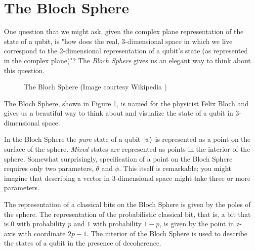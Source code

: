 \documentclass[11pt, oneside]{article}   	%
\begin{document}
\section{The Bloch Sphere}
One question that we might ask, given the complex plane representation of the state of a qubit, is "how does the real, 3-dimensional space in which we live correspond 
to the 2-dimensional representation of a qubit's state (as represented in the complex plane)"? The \emph{Bloch Sphere} gives us an elegant way to think about this question.

\begin{figure}[h]
\caption{The Bloch Sphere (Image courtesy Wikipedia \cite{wiki:bloch_sphere})}
\label{fig:bloch_sphere}
\end{figure}

\bigskip
\noindent
The Bloch Sphere, shown in Figure \ref{fig:bloch_sphere}, is named for the physicist Felix Bloch \cite{1946PhRv...70..460B} and gives us a beautiful way to think about and 
visualize the state of a qubit in 3-dimensional space.  

\bigskip
\noindent
In the Bloch Sphere the \emph{pure} state of a qubit $\ket{\psi}$  is represented as a point on the surface of the sphere. \emph{Mixed} states are represented
as points in the interior of the sphere.
Somewhat surprisingly, specification of a point on the Bloch Sphere requires only two parameters, 
$\theta$ and $\phi$. This itself is remarkable; you might imagine that describing a vector in 3-dimensional space might take three or more parameters. 

\bigskip
\noindent
The representation of a classical bits on the Bloch Sphere  is given by the poles of the sphere.  The representation of the probabilistic classical bit, that is, a bit that is $0$ with probability $p$ and $1$ with 
probability $1 - p$, is given by the point in z-axis with coordinate $2p - 1$. The interior of the Bloch Sphere is used to describe the states of a qubit in the presence of decoherence.
\end{document}
